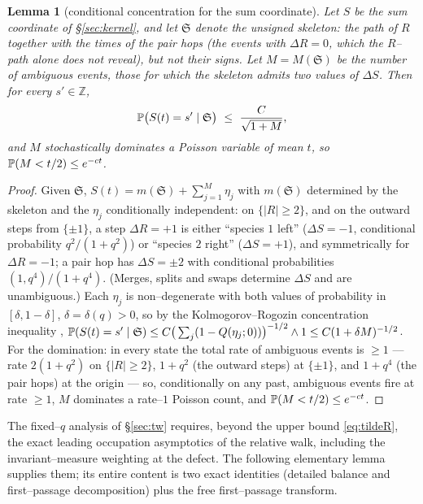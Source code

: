 \documentclass[11pt]{article}
\theoremstyle{plain}
\newtheorem{lemma}[theorem]{Lemma}
\theoremstyle{definition}
\theoremstyle{remark}
\newcommand{\Z}{\mathbb{Z}}\newcommand{\R}{\mathbb{R}}\newcommand{\N}{\mathbb{N}}
\begin{document}
\begin{lemma}[conditional concentration for the sum coordinate]\label{lem:Slclt}
Let $S$ be the sum coordinate of \S\ref{sec:kernel}, and let $\mathfrak S$ denote the
\emph{unsigned skeleton}: the path of $R$ together with the times of the pair hops
(the events with $\Delta R=0$, which the $R$--path alone does not reveal), but not
their signs. Let $M=M(\mathfrak S)$ be the number of \emph{ambiguous} events, those
for which the skeleton admits two values of $\Delta S$. Then for every $s'\in\Z$,
\[
  \PP\big(S(t)=s'\mid \mathfrak S\big)\ \le\ \frac{C}{\sqrt{1+M}},
\]
and $M$ stochastically dominates a Poisson variable of mean $t$, so
$\mathbb{P}(M<t/2)\le e^{-ct}$.
\end{lemma}
\begin{proof}
Given $\mathfrak S$, $S(t)=m(\mathfrak S)+\sum_{j=1}^M\eta_j$ with $m(\mathfrak S)$
determined by the skeleton and the $\eta_j$ conditionally independent: on
$\{|R|\ge2\}$, and on the outward steps from $\{\pm1\}$, a step $\Delta R=+1$ is
either ``species $1$ left'' ($\Delta S=-1$, conditional probability $q^2/(1+q^2)$) or
``species $2$ right'' ($\Delta S=+1$), and symmetrically for $\Delta R=-1$; a pair
hop has $\Delta S=\pm2$ with conditional probabilities $(1,q^4)/(1+q^4)$. (Merges,
splits and swaps determine $\Delta S$ and are unambiguous.) Each $\eta_j$ is
non--degenerate with both values of probability in $[\delta,1-\delta]$,
$\delta=\delta(q)>0$, so by the Kolmogorov--Rogozin concentration inequality
\cite[Ch.~III]{Petrov},
$\mathbb{P}(S(t)=s'\mid\mathfrak S)\le C\big(\sum_j(1-Q(\eta_j;0))\big)^{-1/2}\wedge1
\le C(1+\delta M)^{-1/2}$. For the domination: in every state the total rate of
ambiguous events is $\ge1$ --- rate $2(1+q^2)$ on $\{|R|\ge2\}$, $1+q^2$ (the outward
steps) at $\{\pm1\}$, and $1+q^4$ (the pair hops) at the origin --- so, conditionally
on any past, ambiguous events fire at rate $\ge1$, $M$ dominates a rate--$1$ Poisson
count, and $\mathbb{P}(M<t/2)\le e^{-ct}$.
\end{proof}

The fixed--$q$ analysis of \S\ref{sec:tw} requires, beyond the upper bound
\eqref{eq:tildeR}, the exact leading occupation asymptotics of the relative walk,
including the invariant--measure weighting at the defect. The following elementary
lemma supplies them; its entire content is two exact identities (detailed balance and
first--passage decomposition) plus the free first--passage transform.
\end{document}
